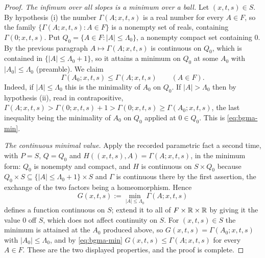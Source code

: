 \begin{proof}
\emph{The infimum over all slopes is a minimum over a ball.}
Let $(x,t,s)\in S$. By hypothesis (i) the number $\Gamma(A;x,t,s)$ is a real
number for every $A\in F$, so the family $\{\Gamma(A;x,t,s):A\in F\}$ is a
nonempty set of reals, containing $\Gamma(0;x,t,s)$. Put
$Q_0=\{A\in F:|A|\le\Lambda_0\}$, a nonempty compact set containing $0$. By the
previous paragraph $A\mapsto\Gamma(A;x,t,s)$ is continuous on $Q_0$, which is
contained in $\{|A|\le\Lambda_0+1\}$, so it attains a minimum on $Q_0$ at some
$A_0$ with $|A_0|\le\Lambda_0$ (preamble). We claim
\begin{equation}\label{eq:bgma-min}
  \Gamma(A_0;x,t,s)\le\Gamma(A;x,t,s)\qquad(A\in F).
\end{equation}
Indeed, if $|A|\le\Lambda_0$ this is the minimality of $A_0$ on $Q_0$. If
$|A|>\Lambda_0$ then by hypothesis (ii), read in contrapositive,
$\Gamma(A;x,t,s)>\Gamma(0;x,t,s)+1>\Gamma(0;x,t,s)\ge\Gamma(A_0;x,t,s)$, the last
inequality being the minimality of $A_0$ on $Q_0$ applied at $0\in Q_0$. This is
\eqref{eq:bgma-min}.

\emph{The continuous minimal value.}
Apply the recorded parametric fact a second time, with $P=S$, $Q=Q_0$ and
$H((x,t,s),A)=\Gamma(A;x,t,s)$, in the minimum form: $Q_0$ is nonempty and
compact, and $H$ is continuous on $S\times Q_0$ because
$Q_0\times S\subseteq\{|A|\le\Lambda_0+1\}\times S$ and $\Gamma$ is continuous
there by the first assertion, the exchange of the two factors being a
homeomorphism. Hence
\[
  G(x,t,s):=\min_{|A|\le\Lambda_0}\Gamma(A;x,t,s)
\]
defines a function continuous on $S$; extend it to all of $F\times\mathbb{R}\times\mathbb{R}$ by
giving it the value $0$ off $S$, which does not affect continuity on $S$. For
$(x,t,s)\in S$ the minimum is attained at the $A_0$ produced above, so
$G(x,t,s)=\Gamma(A_0;x,t,s)$ with $|A_0|\le\Lambda_0$, and by
\eqref{eq:bgma-min} $G(x,t,s)\le\Gamma(A;x,t,s)$ for every $A\in F$. These are
the two displayed properties, and the proof is complete.
\end{proof}
